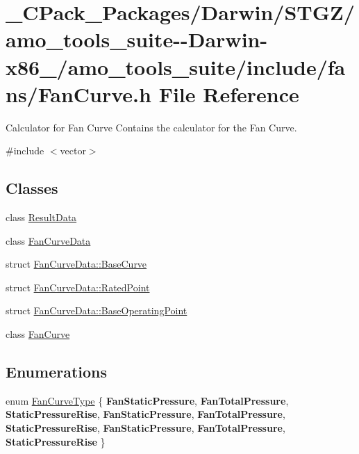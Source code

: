 \hypertarget{___c_pack___packages_2_darwin_2_s_t_g_z_2amo__tools__suite--_darwin-x86__64_2amo__tools__suite_2include_2fans_2_fan_curve_8h}{}\section{\+\_\+\+C\+Pack\+\_\+\+Packages/\+Darwin/\+S\+T\+G\+Z/amo\+\_\+tools\+\_\+suite-\/-\/\+Darwin-\/x86\+\_/amo\+\_\+tools\+\_\+suite/include/fans/\+Fan\+Curve.h File Reference}
\label{___c_pack___packages_2_darwin_2_s_t_g_z_2amo__tools__suite--_darwin-x86__64_2amo__tools__suite_2include_2fans_2_fan_curve_8h}


Calculator for Fan Curve Contains the calculator for the Fan Curve.  


{\ttfamily \#include $<$vector$>$}\newline
\subsection*{Classes}
\begin{DoxyCompactItemize}
\item 
class \hyperlink{class_result_data}{Result\+Data}
\item 
class \hyperlink{class_fan_curve_data}{Fan\+Curve\+Data}
\item 
struct \hyperlink{struct_fan_curve_data_1_1_base_curve}{Fan\+Curve\+Data\+::\+Base\+Curve}
\item 
struct \hyperlink{struct_fan_curve_data_1_1_rated_point}{Fan\+Curve\+Data\+::\+Rated\+Point}
\item 
struct \hyperlink{struct_fan_curve_data_1_1_base_operating_point}{Fan\+Curve\+Data\+::\+Base\+Operating\+Point}
\item 
class \hyperlink{class_fan_curve}{Fan\+Curve}
\end{DoxyCompactItemize}
\subsection*{Enumerations}
\begin{DoxyCompactItemize}
\item 
enum \hyperlink{___c_pack___packages_2_darwin_2_s_t_g_z_2amo__tools__suite--_darwin-x86__64_2amo__tools__suite_2include_2fans_2_fan_curve_8h_a5c9bed68c43ea99f4baf31c4a4cdd0fa}{Fan\+Curve\+Type} \{ \newline
{\bfseries Fan\+Static\+Pressure}, 
{\bfseries Fan\+Total\+Pressure}, 
{\bfseries Static\+Pressure\+Rise}, 
{\bfseries Fan\+Static\+Pressure}, 
\newline
{\bfseries Fan\+Total\+Pressure}, 
{\bfseries Static\+Pressure\+Rise}, 
{\bfseries Fan\+Static\+Pressure}, 
{\bfseries Fan\+Total\+Pressure}, 
\newline
{\bfseries Static\+Pressure\+Rise}
 \}
\end{DoxyCompactItemize}


